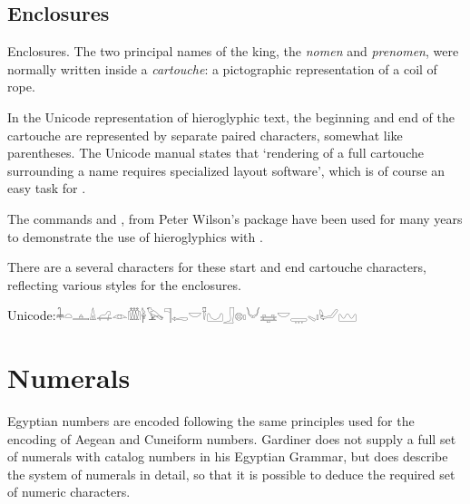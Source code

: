 \subsection{Enclosures}

Enclosures. The two principal names of the king, the \emph{nomen} and \emph{prenomen}, were normally
written inside a \emph{cartouche}: a pictographic representation of a coil of rope.

In the Unicode representation of hieroglyphic text, the beginning and end of the cartouche
are represented by separate paired characters, somewhat like parentheses. The Unicode manual states that `rendering of a full cartouche surrounding a name requires specialized layout software', which is of course an easy task for \tex.

\begin{macro}{\cartouche}
The commands \cmd{\cartouche} and \cmd{\cartouche}, from Peter Wilson's  package have been used for many years to demonstrate the use of hieroglyphics with \latexe. 
\end{macro}

There are a several characters for these start and end cartouche characters, reflecting various styles for the enclosures.


Unicode:{\hiero 𓇓𓏏𓊵𓏙𓊩𓁹𓏃𓋀𓅂𓊹𓉻𓎟𓍋𓈋𓃀𓊖𓏤𓄋𓈐𓎟𓇾𓈅𓏤𓂦𓈉 }

\textpmhg{\HQ} 


\section{Numerals}

Egyptian numbers are encoded following the same principles used for the
encoding of Aegean and Cuneiform numbers. Gardiner does not supply a full set of
numerals with catalog numbers in his Egyptian Grammar, but does describe the system of
numerals in detail, so that it is possible to deduce the required set of numeric characters.

